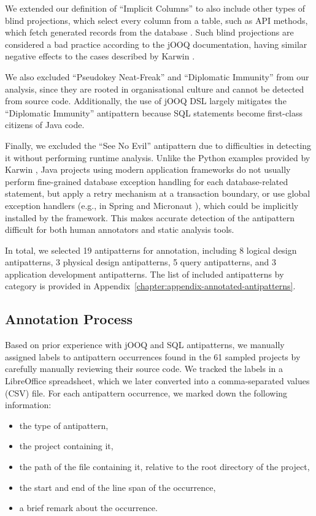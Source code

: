 We extended our definition of “Implicit Columns” to also include other types of blind projections, which select every column from a table, such as API methods, which fetch generated records from the database . Such blind projections are considered a bad practice according to the jOOQ documentation, having similar negative effects to the cases described by Karwin .

We also excluded “Pseudokey Neat-Freak” and “Diplomatic Immunity” from our analysis, since they are rooted in organisational culture and cannot be detected from source code. Additionally, the use of jOOQ DSL largely mitigates the “Diplomatic Immunity” antipattern because SQL statements become first-class citizens of Java code.

Finally, we excluded the “See No Evil” antipattern due to difficulties in detecting it without performing runtime analysis. Unlike the Python examples provided by Karwin , Java projects using modern application frameworks do not usually perform fine-grained database exception handling for each database-related statement, but apply a retry mechanism at a transaction boundary, or use global exception handlers (e.g., in Spring  and Micronaut ), which could be implicitly installed by the framework. This makes accurate detection of the antipattern difficult for both human annotators and static analysis tools.

In total, we selected 19 antipatterns for annotation, including 8 logical design antipatterns, 3 physical design antipatterns, 5 query antipatterns, and 3 application development antipatterns. The list of included antipatterns by category is provided in Appendix~\ref{chapter:appendix-annotated-antipatterns}.

\subsection{Annotation Process}

Based on prior experience with jOOQ and SQL antipatterns, we manually assigned labels to antipattern occurrences found in the 61 sampled projects by carefully manually reviewing their source code. We tracked the labels in a LibreOffice spreadsheet, which we later converted into a comma-separated values (CSV) file. For each antipattern occurrence, we marked down the following information:
\begin{itemize}
    \item the type of antipattern,
    \item the project containing it,
    \item the path of the file containing it, relative to the root directory of the project,
    \item the start and end of the line span of the occurrence,
    \item a brief remark about the occurrence.
\end{itemize}

